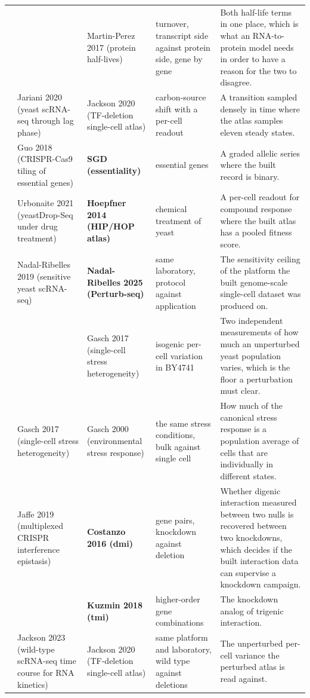 \begin{landscape}
\begin{longtable}{@{}r@{\hspace{4pt}} L{42mm} L{44mm} L{48mm} L{96mm}@{}}
 &  & Martin-Perez 2017 (protein half-lives) & turnover, transcript side against protein side, gene by gene & Both half-life terms in one place, which is what an RNA-to-protein model needs in order to have a reason for the two to disagree. \\
 & Jariani 2020 (yeast scRNA-seq through lag phase) & Jackson 2020 (TF-deletion single-cell atlas) & carbon-source shift with a per-cell readout & A transition sampled densely in time where the atlas samples eleven steady states. \\
 & Guo 2018 (CRISPR-Cas9 tiling of essential genes) & \textbf{SGD (essentiality)} & essential genes & A graded allelic series where the built record is binary. \\
 & Urbonaite 2021 (yeastDrop-Seq under drug treatment) & \textbf{Hoepfner 2014 (HIP/HOP atlas)} & chemical treatment of yeast & A per-cell readout for compound response where the built atlas has a pooled fitness score. \\
 & Nadal-Ribelles 2019 (sensitive yeast scRNA-seq) & \textbf{Nadal-Ribelles 2025 (Perturb-seq)} & same laboratory, protocol against application & The sensitivity ceiling of the platform the built genome-scale single-cell dataset was produced on. \\
 &  & Gasch 2017 (single-cell stress heterogeneity) & isogenic per-cell variation in BY4741 & Two independent measurements of how much an unperturbed yeast population varies, which is the floor a perturbation must clear. \\
 & Gasch 2017 (single-cell stress heterogeneity) & Gasch 2000 (environmental stress response) & the same stress conditions, bulk against single cell & How much of the canonical stress response is a population average of cells that are individually in different states. \\
 & Jaffe 2019 (multiplexed CRISPR interference epistasis) & \textbf{Costanzo 2016 (dmi)} & gene pairs, knockdown against deletion & Whether digenic interaction measured between two nulls is recovered between two knockdowns, which decides if the built interaction data can supervise a knockdown campaign. \\
 &  & \textbf{Kuzmin 2018 (tmi)} & higher-order gene combinations & The knockdown analog of trigenic interaction. \\
 & Jackson 2023 (wild-type scRNA-seq time course for RNA kinetics) & Jackson 2020 (TF-deletion single-cell atlas) & same platform and laboratory, wild type against deletions & The unperturbed per-cell variance the perturbed atlas is read against. \\

\end{longtable}
\end{landscape}
